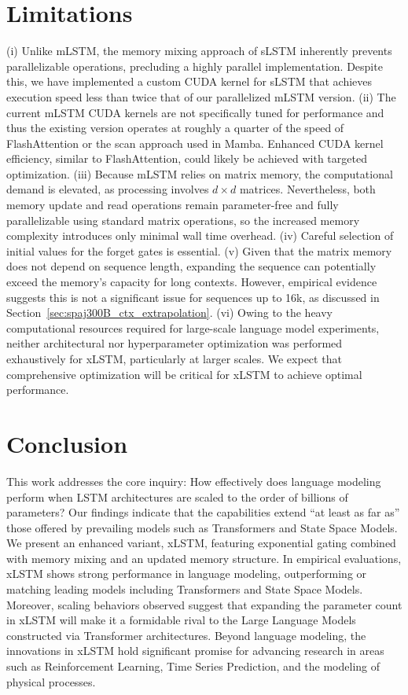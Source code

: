 \section{Limitations}

(i) Unlike mLSTM, the memory mixing approach of sLSTM inherently prevents parallelizable operations, precluding a highly parallel implementation. Despite this, we have implemented a custom CUDA kernel for sLSTM that achieves execution speed less than twice that of our parallelized mLSTM version. (ii) The current mLSTM CUDA kernels are not specifically tuned for performance and thus the existing version operates at roughly a quarter of the speed of FlashAttention or the scan approach used in Mamba. Enhanced CUDA kernel efficiency, similar to FlashAttention, could likely be achieved with targeted optimization. (iii) Because mLSTM relies on matrix memory, the computational demand is elevated, as processing involves $d \times d$ matrices. Nevertheless, both memory update and read operations remain parameter-free and fully parallelizable using standard matrix operations, so the increased memory complexity introduces only minimal wall time overhead. (iv) Careful selection of initial values for the forget gates is essential. (v) Given that the matrix memory does not depend on sequence length, expanding the sequence can potentially exceed the memory’s capacity for long contexts. However, empirical evidence suggests this is not a significant issue for sequences up to 16k, as discussed in Section~\ref{sec:spaj300B_ctx_extrapolation}. (vi) Owing to the heavy computational resources required for large-scale language model experiments, neither architectural nor hyperparameter optimization was performed exhaustively for xLSTM, particularly at larger scales. We expect that comprehensive optimization will be critical for xLSTM to achieve optimal performance.

\section{Conclusion}
This work addresses the core inquiry: How effectively does language modeling perform when LSTM architectures are scaled to the order of billions of parameters? Our findings indicate that the capabilities extend “at least as far as” those offered by prevailing models such as Transformers and State Space Models. We present an enhanced variant, xLSTM, featuring exponential gating combined with memory mixing and an updated memory structure. In empirical evaluations, xLSTM shows strong performance in language modeling, outperforming or matching leading models including Transformers and State Space Models. Moreover, scaling behaviors observed suggest that expanding the parameter count in xLSTM will make it a formidable rival to the Large Language Models constructed via Transformer architectures. Beyond language modeling, the innovations in xLSTM hold significant promise for advancing research in areas such as Reinforcement Learning, Time Series Prediction, and the modeling of physical processes.

